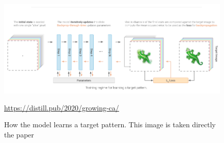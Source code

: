 \begin{figure}[h]
	\includegraphics[width=1\textwidth]{../Figures/training_nca.png}
	\centering
	\caption[NCA Training]{How the model learns a target pattern. This image is taken directly the  paper \cite{growing_nca}} 
	\label{fig:nca-train}
	\url{https://distill.pub/2020/growing-ca/}
\end{figure}

